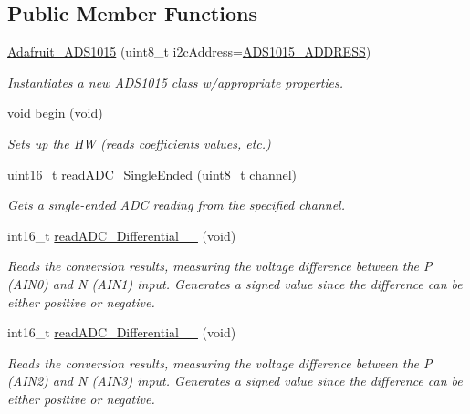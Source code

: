 \subsection*{Public Member Functions}
\begin{DoxyCompactItemize}
\item 
\hyperlink{class_adafruit___a_d_s1015_a12dfb7b48af1a8e411c59f775c6457ab}{Adafruit\+\_\+\+A\+D\+S1015} (uint8\+\_\+t i2c\+Address=\hyperlink{_cool_adafruit___a_d_s1015_8h_ae55d158023984e8f0ddc80b58d5b30dc}{A\+D\+S1015\+\_\+\+A\+D\+D\+R\+E\+SS})
\begin{DoxyCompactList}\small\item\em Instantiates a new A\+D\+S1015 class w/appropriate properties. \end{DoxyCompactList}\item 
void \hyperlink{class_adafruit___a_d_s1015_a6eba7c3cd854927f60883bb371e5faa6}{begin} (void)
\begin{DoxyCompactList}\small\item\em Sets up the HW (reads coefficients values, etc.) \end{DoxyCompactList}\item 
uint16\+\_\+t \hyperlink{class_adafruit___a_d_s1015_a40f38b9e1f3ec397c0670dd632510235}{read\+A\+D\+C\+\_\+\+Single\+Ended} (uint8\+\_\+t channel)
\begin{DoxyCompactList}\small\item\em Gets a single-\/ended A\+DC reading from the specified channel. \end{DoxyCompactList}\item 
int16\+\_\+t \hyperlink{class_adafruit___a_d_s1015_a56582333958e66efaccd3d4a8a47e3ff}{read\+A\+D\+C\+\_\+\+Differential\+\_\+\_} (void)
\begin{DoxyCompactList}\small\item\em Reads the conversion results, measuring the voltage difference between the P (A\+I\+N0) and N (A\+I\+N1) input. Generates a signed value since the difference can be either positive or negative. \end{DoxyCompactList}\item 
int16\+\_\+t \hyperlink{class_adafruit___a_d_s1015_a38311881bcab46f7496c4bb6e4cad576}{read\+A\+D\+C\+\_\+\+Differential\+\_\+\_} (void)
\begin{DoxyCompactList}\small\item\em Reads the conversion results, measuring the voltage difference between the P (A\+I\+N2) and N (A\+I\+N3) input. Generates a signed value since the difference can be either positive or negative. \end{DoxyCompactList}\item 

\end{DoxyCompactItemize}
